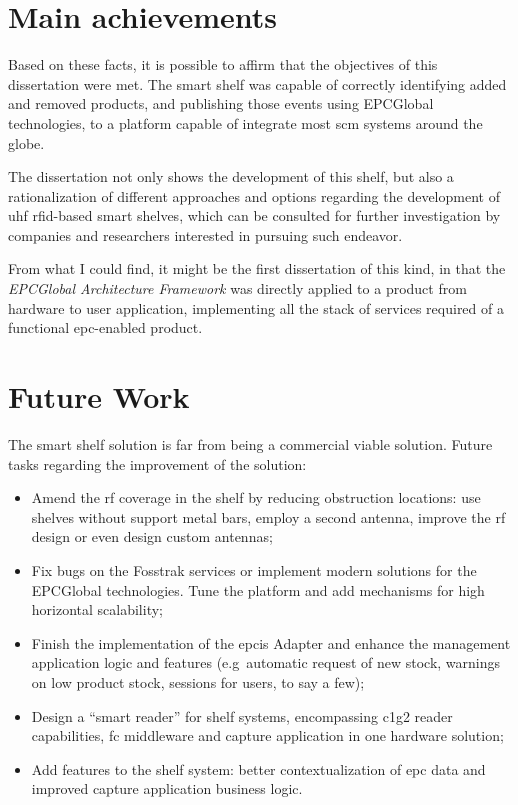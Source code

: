\section{Main achievements}

Based on these facts, it is possible to affirm that the objectives of this dissertation were met.
The smart shelf was capable of correctly identifying added and removed products, and publishing those events using EPCGlobal technologies, to a platform capable of integrate most \ac{scm} systems around the globe.

The dissertation not only shows the development of this shelf, but also a rationalization of different approaches and options regarding the development of \ac{uhf} \ac{rfid}-based smart shelves, which can be consulted for further investigation by companies and researchers interested in pursuing such endeavor.

From what I could find, it might be the first dissertation of this kind, in that the \emph{EPCGlobal Architecture Framework} was directly applied to a product from hardware to user application, implementing all the stack of services required of a functional \ac{epc}-enabled product.

\section{Future Work}

The smart shelf solution is far from being a commercial viable solution.
Future tasks regarding the improvement of the solution:

\begin{itemize}
    \item Amend the \ac{rf} coverage in the shelf by reducing obstruction locations: use shelves without support metal bars, employ a second antenna, improve the \ac{rf} design or even design custom antennas;
    \item Fix bugs on the Fosstrak services or implement modern solutions for the EPCGlobal technologies. Tune the platform and add mechanisms for high horizontal scalability;
    \item Finish the implementation of the \ac{epcis} Adapter and enhance the management application logic and features (e.g\ automatic request of new stock, warnings on low product stock, sessions for users, to say a few);
    \item Design a ``smart reader'' for shelf systems, encompassing \ac{c1g2} reader capabilities, \ac{fc} middleware and capture application in one hardware solution;
    \item Add features to the shelf system: better contextualization of \ac{epc} data and improved capture application business logic.
\end{itemize}